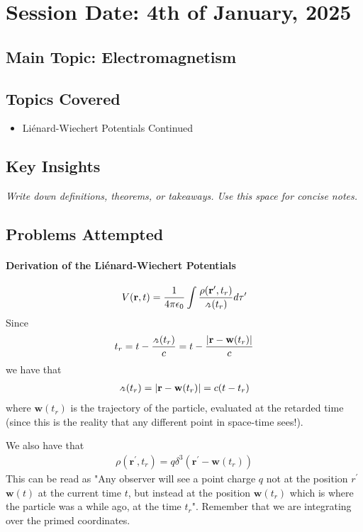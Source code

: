 \section{Session Date: 4th of January, 2025}
\subsection*{Main Topic: Electromagnetism}
\subsection*{Topics Covered}
\begin{itemize}
    \item Liénard-Wiechert Potentials Continued
\end{itemize}

\subsection*{Key Insights}
\textit{Write down definitions, theorems, or takeaways. Use this space for concise notes.}

\subsection*{Problems Attempted}
\paragraph{Derivation of the Liénard-Wiechert Potentials}
\begin{align*}
    V(\mathbf{r}, t) = \frac{1}{4\pi\epsilon_0} \int \frac{\rho(\mathbf{r}^{\prime}, t_r)}{\griffr[2] (t_r)} d \tau ^{\prime} 
\end{align*}
Since \begin{align*}
    t_r = t - \frac{\griffr[2] (t_r) }{c} = t - \frac{\left| \mathbf{r} - \mathbf{w}(t_r)\right|}{c}
\end{align*}
we have that \begin{align*}
    \griffr[2] (t_r) = \left| \mathbf{r} - \mathbf{w}(t_r)\right| = c (t - t_r)
\end{align*}
where \(\mathbf{w}(t_r)\) is the trajectory of the particle, evaluated at the retarded time (since this is the reality that any different point in space-time sees!).

We also have that \begin{align*}
    \rho(\mathbf{r}^{\prime} , t_r) = q \delta ^3(\mathbf{r}^{\prime} - \mathbf{w}(t_r))
\end{align*}
This can be read as "Any observer will see a point charge \(q\) not at the position \(r^{\prime} \)  \(\mathbf{w}(t)\) at the current time \(t\), but instead at the position \(\mathbf{w}(t_r)\) which is where the particle was a while ago, at the time \(t_r\)". Remember that we are integrating over the primed coordinates.

